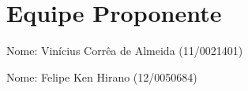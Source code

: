 \chapter{Equipe Proponente}

Nome: Vinícius Corrêa de Almeida (11/0021401)

Nome: Felipe Ken Hirano (12/0050684)